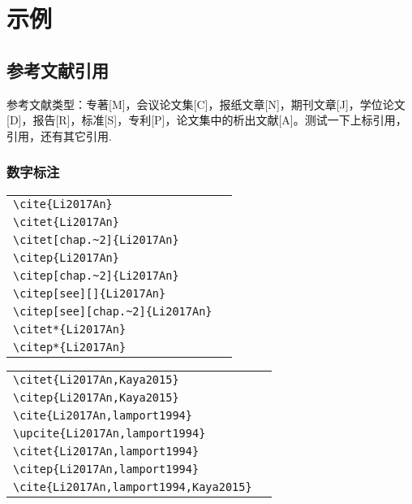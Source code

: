 \chapter{示例}
\section{参考文献引用}
参考文献类型：专著[M]，会议论文集[C]，报纸文章[N]，期刊文章[J]，学位论文[D]，报告[R]，标准[S]，专利[P]，论文集中的析出文献[A]。测试一下上标引用，引用\cite{Le2016Multiple,Kaya2015,tf2017}，还有其它引用.
\subsection{数字标注}
\noindent
\begin{tabular}{l@{\quad$\Rightarrow$\quad}l}
	\verb|\cite{Li2017An}| & \cite{Li2017An}\\
	\verb|\citet{Li2017An}| & \citet{Li2017An}\\
	\verb|\citet[chap.~2]{Li2017An}| & \citet[chap.~2]{Li2017An}\\[0.5ex]
	\verb|\citep{Li2017An}| & \citep{Li2017An}\\
	\verb|\citep[chap.~2]{Li2017An}| & \citep[chap.~2]{Li2017An}\\
	\verb|\citep[see][]{Li2017An}| & \citep[see][]{Li2017An}\\
	\verb|\citep[see][chap.~2]{Li2017An}| & \citep[see][chap.~2]{Li2017An}\\[0.5ex]
	\verb|\citet*{Li2017An}| & \citet*{Li2017An}\\
	\verb|\citep*{Li2017An}| & \citep*{Li2017An}\\
\end{tabular}
\par\noindent
\begin{tabular}{l@{\quad$\Rightarrow$\quad}l}
	\verb|\citet{Li2017An,Kaya2015}| & \citet{Li2017An,Kaya2015}\\
	\verb|\citep{Li2017An,Kaya2015}| & \citep{Li2017An,Kaya2015}\\
	\verb|\cite{Li2017An,lamport1994}| & \cite{Li2017An,lamport1994}\\
	\verb|\upcite{Li2017An,lamport1994}| & \upcite{Li2017An,lamport1994}\\
	\verb|\citet{Li2017An,lamport1994}| & \citet{Li2017An,lamport1994}\\
	\verb|\citep{Li2017An,lamport1994}| & \citep{Li2017An,lamport1994}\\
	\verb|\cite{Li2017An,lamport1994,Kaya2015}| & \cite{Li2017An,lamport1994,Kaya2015}\\
\end{tabular}

